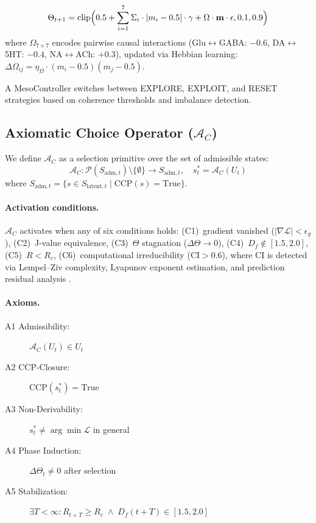 \documentclass[10pt,letterpaper]{article}
\begin{document}
\begin{equation}
  \Theta_{t+1} = \text{clip}\Bigl(
    0.5 + \sum_{i=1}^{7} \Sigma_i \cdot |m_i - 0.5| \cdot \gamma
    + \Omega \cdot \mathbf{m} \cdot \epsilon
  , 0.1, 0.9\Bigr)
  \label{eq:theta}
\end{equation}
where $\Omega_{7 \times 7}$ encodes pairwise causal interactions
(Glu$\leftrightarrow$GABA: $-0.6$, DA$\leftrightarrow$5HT: $-0.4$,
NA$\leftrightarrow$ACh: $+0.3$), updated via Hebbian learning:
$\Delta\Omega_{ij} = \eta_\Omega \cdot (m_i - 0.5)(m_j - 0.5)$.

A MesoController switches between EXPLORE, EXPLOIT, and RESET
strategies based on coherence thresholds and imbalance detection.

\subsection{Axiomatic Choice Operator ($\mathcal{A}_C$)}

We define $\mathcal{A}_C$ as a selection primitive over the set of
admissible states:
\begin{equation}
  \mathcal{A}_C: \mathcal{P}(S_{\text{adm},t}) \setminus \{\emptyset\}
  \to S_{\text{adm},t}, \quad
  s^*_t = \mathcal{A}_C(U_t)
  \label{eq:ac}
\end{equation}
where $S_{\text{adm},t} = \{s \in S_{\text{latent},t} \mid
\text{CCP}(s) = \text{True}\}$.

\paragraph{Activation conditions.}
$\mathcal{A}_C$ activates when any of six conditions holds:
(C1)~gradient vanished ($|\nabla \mathcal{L}| < \epsilon_g$),
(C2)~J-value equivalence,
(C3)~$\Theta$ stagnation ($\Delta\Theta \to 0$),
(C4)~$D_f \notin [1.5, 2.0]$,
(C5)~$R < R_c$,
(C6)~computational irreducibility ($\text{CI} > 0.6$),
where CI is detected via Lempel--Ziv complexity, Lyapunov exponent
estimation, and prediction residual analysis \citep{wolfram2002}.

\paragraph{Axioms.}
\begin{description}
  \item[A1 Admissibility:] $\mathcal{A}_C(U_t) \in U_t$
  \item[A2 CCP-Closure:] $\text{CCP}(s^*_t) = \text{True}$
  \item[A3 Non-Derivability:] $s^*_t \neq \arg\min \mathcal{L}$
    in general
  \item[A4 Phase Induction:] $\Delta\Theta_t \neq 0$ after selection
  \item[A5 Stabilization:]
    $\exists T < \infty: R_{t+T} \geq R_c \;\land\;
    D_f(t+T) \in [1.5, 2.0]$
\end{description}
\end{document}
